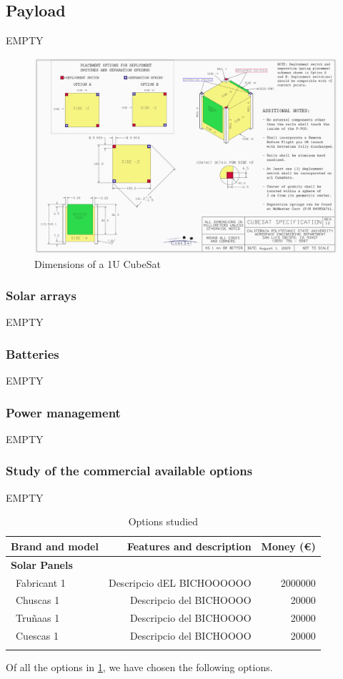 \subsection{Payload}

EMPTY

\begin{figure}[h]
\includegraphics[scale=0.6]{./sections/SatelliteDesign/images/CubeSatDesign}
\centering
\caption{Dimensions of a 1U CubeSat \cite{cubesatdimensions}}
\end{figure}

\subsubsection{Solar arrays}
EMPTY
\subsubsection{Batteries}
EMPTY
\subsubsection{Power management}
EMPTY
\subsubsection{Study of the commercial available options}
EMPTY

\begin{longtable}{| l | r | r | }
\hline
\rowcolor[gray]{0.80}	\textbf{Brand and model} &  \textbf{Features and description}     & \textbf{Money (\euro)}   \\
\hline
\endfirsthead

\rowcolor[gray]{0.85} \textbf{Solar Panels} &  &  \\
	   ~Fabricant 1 & Descripcio dEL BICHOOOOOO & 2000000 \\
	   ~Chuscas 1 & Descripcio del BICHOOOO & 20000 \\
	   ~Truñaas 1 & Descripcio del BICHOOOO & 20000 \\
	   ~Cuescas 1 & Descripcio del BICHOOOO & 20000 \\
	\hline

\caption{Options studied}
\label{epsoptionstable}
\end{longtable}

Of all the options in \ref{epsoptionstable}, we have chosen the following options.
